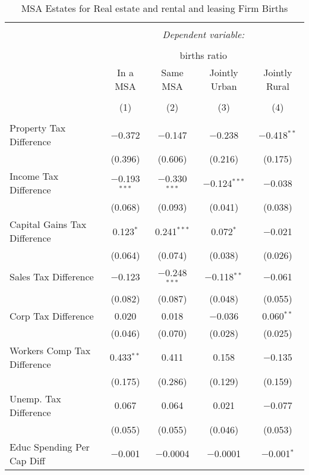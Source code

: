 
\begin{table}[!htbp] \centering 
  \caption{MSA Estates for  Real estate and rental and leasing Firm Births} 
  \label{53metro} 
\begin{tabular}{@{\extracolsep{5pt}}lcccc} 
\\[-1.8ex]\hline 
\hline \\[-1.8ex] 
 & \multicolumn{4}{c}{\textit{Dependent variable:}} \\ 
\cline{2-5} 
\\[-1.8ex] & \multicolumn{4}{c}{births ratio} \\ 
 & In a MSA & Same MSA & Jointly Urban & Jointly Rural \\ 
\\[-1.8ex] & (1) & (2) & (3) & (4)\\ 
\hline \\[-1.8ex] 
 Property Tax Difference & $-$0.372 & $-$0.147 & $-$0.238 & $-$0.418$^{**}$ \\ 
  & (0.396) & (0.606) & (0.216) & (0.175) \\ 
  Income Tax Difference & $-$0.193$^{***}$ & $-$0.330$^{***}$ & $-$0.124$^{***}$ & $-$0.038 \\ 
  & (0.068) & (0.093) & (0.041) & (0.038) \\ 
  Capital Gains Tax Difference & 0.123$^{*}$ & 0.241$^{***}$ & 0.072$^{*}$ & $-$0.021 \\ 
  & (0.064) & (0.074) & (0.038) & (0.026) \\ 
  Sales Tax Difference & $-$0.123 & $-$0.248$^{***}$ & $-$0.118$^{**}$ & $-$0.061 \\ 
  & (0.082) & (0.087) & (0.048) & (0.055) \\ 
  Corp Tax Difference & 0.020 & 0.018 & $-$0.036 & 0.060$^{**}$ \\ 
  & (0.046) & (0.070) & (0.028) & (0.025) \\ 
  Workers Comp Tax Difference & 0.433$^{**}$ & 0.411 & 0.158 & $-$0.135 \\ 
  & (0.175) & (0.286) & (0.129) & (0.159) \\ 
  Unemp. Tax Difference & 0.067 & 0.064 & 0.021 & $-$0.077 \\ 
  & (0.055) & (0.055) & (0.046) & (0.053) \\ 
  Educ Spending Per Cap Diff & $-$0.001 & $-$0.0004 & $-$0.0001 & $-$0.001$^{*}$ \\ 

\end{tabular}
\end{table}
